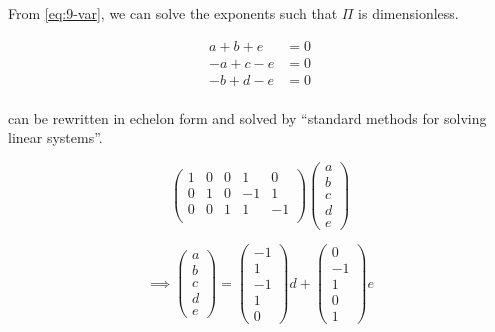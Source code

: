 \documentclass[12pt]{article}
\begin{document}
  From \cref{eq:9-var}, we can solve the exponents such that $\Pi$ is
  dimensionless.

  \begin{equation}
    \label{eq:9-exp-eqs}
    \begin{aligned}
      a + b + e &= 0 \\
      -a + c - e &= 0 \\
      -b + d - e &= 0 \\
    \end{aligned}
  \end{equation}

   can be rewritten in echelon form and solved by ``standard
  methods for solving linear systems''.

  \begin{equation}
    \label{eq:9-matrix}
    \begin{pmatrix}
      1 & 0 & 0 & 1 & 0 \\
      0 & 1 & 0 & -1 & 1 \\
      0 & 0 & 1 & 1 & -1 \\
    \end{pmatrix}
    \begin{pmatrix}
      a \\ b \\ c \\ d \\ e
    \end{pmatrix}
  \end{equation}

  \begin{equation}
    \label{eq:9-exp-sol}
    \implies
    \begin{pmatrix}
      a \\ b \\ c \\ d \\ e
    \end{pmatrix}
    =
    \begin{pmatrix}
      -1 \\ 1 \\ -1 \\ 1 \\ 0
    \end{pmatrix}d +
    \begin{pmatrix}
      0 \\ -1 \\ 1 \\ 0 \\ 1
    \end{pmatrix}e
  \end{equation}
\end{document}
